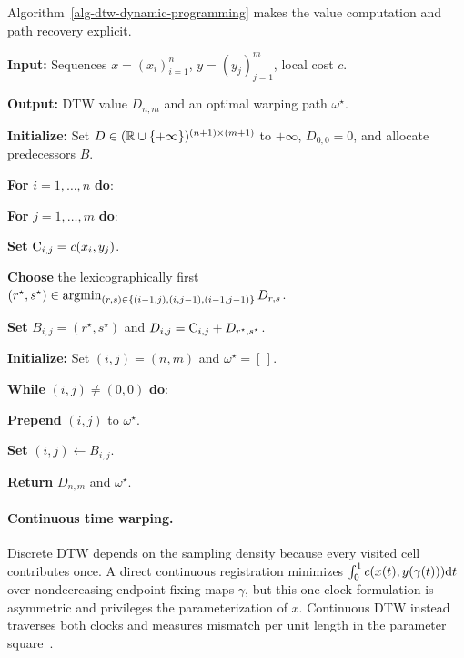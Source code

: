 Algorithm~\ref{alg-dtw-dynamic-programming} makes the value computation and path recovery explicit.

\begin{alg}\label{alg-dtw-dynamic-programming}
\textbf{Input:} Sequences $x=(x_i)_{i=1}^n$, $y=(y_j)_{j=1}^m$, local cost $c$.

\textbf{Output:} DTW value $D_{n,m}$ and an optimal warping path $\omega^\star$.

\textbf{Initialize:} Set $D\in(\mathbb{R}\cup\{+\infty\})^{(n+1)\times(m+1)}$ to $+\infty$, $D_{0,0}=0$, and allocate predecessors $B$.

\textbf{For} $i=1,\ldots,n$ \textbf{do}:
\begin{algblock}
\textbf{For} $j=1,\ldots,m$ \textbf{do}:
\begin{algblock}
\textbf{Set} $\mathrm{C}_{i,j}=c(x_i,y_j)$.

\textbf{Choose} the lexicographically first
$(r^\star,s^\star)\in\operatorname{argmin}_{(r,s)\in\{(i-1,j),(i,j-1),(i-1,j-1)\}}D_{r,s}$.

\textbf{Set} $B_{i,j}=(r^\star,s^\star)$ and $D_{i,j}=\mathrm{C}_{i,j}+D_{r^\star,s^\star}$.
\end{algblock}
\end{algblock}
\textbf{Initialize:} Set $(i,j)=(n,m)$ and $\omega^\star=[\,]$.

\textbf{While} $(i,j)\neq(0,0)$ \textbf{do}:
\begin{algblock}
\textbf{Prepend} $(i,j)$ to $\omega^\star$.

\textbf{Set} $(i,j)\leftarrow B_{i,j}$.
\end{algblock}
\algreturnskip
\textbf{Return} $D_{n,m}$ and $\omega^\star$.
\end{alg}

\paragraph{Continuous time warping.}
Discrete DTW depends on the sampling density because every visited cell contributes once. A direct continuous registration minimizes $\int_0^1 c(x(t),y(\gamma(t)))\mathrm{d} t$ over nondecreasing endpoint-fixing maps $\gamma$, but this one-clock formulation is asymmetric and privileges the parameterization of $x$. Continuous DTW instead traverses both clocks and measures mismatch per unit length in the parameter square~\cite{BuchinNusserWong2022CDTW}.

